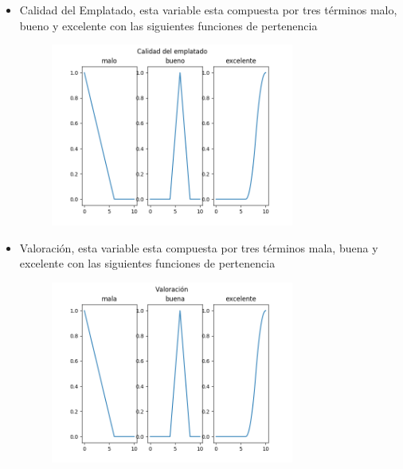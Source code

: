 \documentclass[12pt]{article}
\begin{document}
\begin{itemize}
	\item Calidad del Emplatado, esta variable esta compuesta por tres t\'erminos malo, bueno y excelente con las siguientes funciones de pertenencia
	\begin{figure}[!h]
		\centering
		\includegraphics[width=0.9\linewidth, height=6cm ]{emplatado.png}
	\end{figure}
	\newline
	\newline
	\newline
	\newline
	\item Valoraci\'on, esta variable esta compuesta por tres t\'erminos mala, buena y excelente con las siguientes funciones de pertenencia
	\begin{figure}[!h]
		\centering
		\includegraphics[width=0.9\linewidth, height=6cm ]{val.png}
	\end{figure}
\end{itemize}
\end{document}
